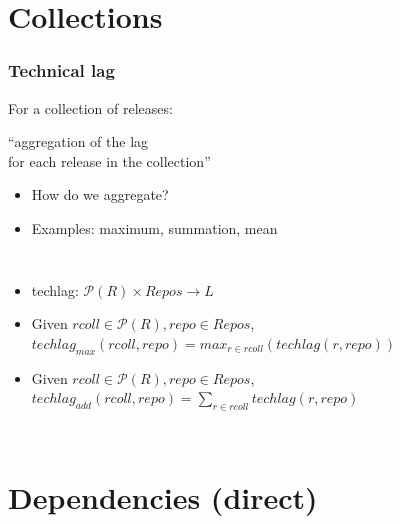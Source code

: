 \documentclass[17pt,aspectratio=169,hyperref=pdfusetitle]{beamer}
\begin{document}
\section{Collections}

\begin{frame}[fragile]
  \frametitle{Technical lag}

  For a collection of releases:

  \vspace{.5cm}
  
  ``aggregation of the lag \\
  for each release in the collection'' \\

  \vspace{.5cm}

  \begin{itemize}
  \item How do we aggregate?
  \item Examples: maximum, summation, mean
  \end{itemize}
\end{frame}

\begin{frame}[fragile]

  \begin{columns}
    \column{\dimexpr\paperwidth-1.2cm}
  \begin{itemize}
  \item techlag: $ \mathcal P(R) \times Repos \rightarrow L $
  \item   Given $rcoll \in \mathcal P(R), repo \in Repos$, \\
    $techlag_{max}(rcoll, repo) = max_{r\in rcoll}(techlag(r, repo))$ 
  \item   Given $rcoll \in \mathcal P(R), repo \in Repos$, \\
    $techlag_{add}(rcoll, repo) = \sum_{r \in rcoll} techlag(r, repo)$
  \end{itemize}    

  \end{columns}

\end{frame}

\section{Dependencies (direct)}
\end{document}
